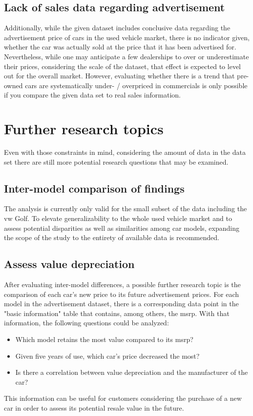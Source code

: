 \subsection{Lack of sales data regarding advertisement}
Additionally, while the given dataset includes conclusive data regarding the advertisement price of cars in the used vehicle market,
there is no indicator given, whether the car was actually sold at the price that it has been advertised for. 
\newline
Nevertheless, while one may anticipate a few dealerships to over or underestimate their prices,
considering the scale of the dataset, that effect is expected to level out for the overall market.
However, evaluating whether there is a trend that pre-owned cars are systematically under- / overpriced in commercials
is only possible if you compare the given data set to real sales information.

\section{Further research topics}
Even with those constraints in mind, considering the amount of data in the data set there are still more potential research questions that may be examined. 

\subsection{Inter-model comparison of findings}
The analysis is currently only valid for the small subset of the data including the \ac{vw} Golf. 
To elevate generalizability to the whole used vehicle market and to assess potential disparities as well as similarities among
car models, expanding the scope of the study to the entirety of available data is recommended.  
\subsection{Assess value depreciation}
After evaluating inter-model differences, a possible further research topic is the comparison of each car's new price
to its future advertisement prices. For each model in the advertisement dataset, there is a corresponding data point
in the "basic information" table that contains, among others, the \ac{msrp}. 
\newline
With that information, the following questions could be analyzed: 
\begin{itemize}
\item Which model retains the most value compared to its \ac{msrp}?
\item Given five years of use, which car's price decreased the most?
\item Is there a correlation between value depreciation and the manufacturer of the car?
\end{itemize}
This information can be useful for customers considering the purchase of a new car in order to assess its potential resale value in the future.